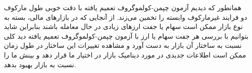  همانطور که دیدیم آزمون چپمن-کولموگروف تعمیم یافته با دقت خوبی طول مارکوف دو فرایند غیرمارکوف وابسته را تخمین می‌زند. از آنجایی که 
 در بازارهای مالی، بسته به نوع بازار ممکن است سهام یا جفت ارزهای زیادی در حال معامله باشند بنابراین شاید بتوانیم با بررسی هر جفت 
 سهام یا ارز با آزمون چپمن-کولموگروف تعمیم یافته دید کلی نسبت به ساختار آن بازار به دست آورد و مشاهده تغییرات این ساختار در 
 طول زمان ممکن است اطلاعات جدیدی در مورد دینامیک بازار در اختیار ما قرار دهد و بینش ما را نسبت به بازار بهبود بدهد.



